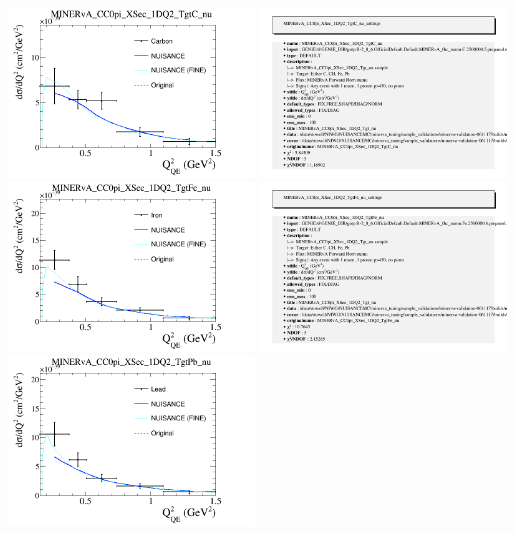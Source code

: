 \documentclass{article}
\begin{document}
\centering
\includegraphics[width=0.49\textwidth]{figures/Carbon_comp.png}
\includegraphics[width=0.49\textwidth]{figures/Carbon_info.png}
\centering
\includegraphics[width=0.49\textwidth]{figures/Iron_comp.png}
\includegraphics[width=0.49\textwidth]{figures/Iron_info.png}
\centering
\includegraphics[width=0.49\textwidth]{figures/Lead_comp.png}
\end{document}
